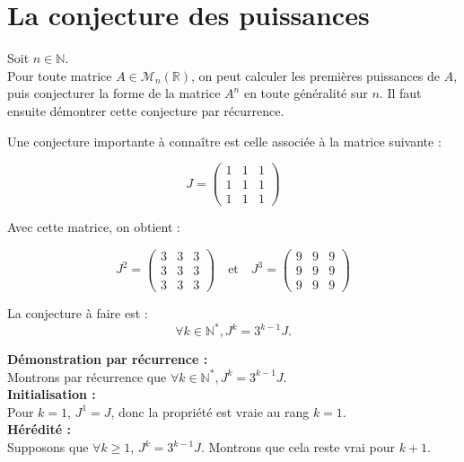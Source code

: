 








\section{La conjecture des puissances}

Soit $n \in \mathbb{N}$.\\
Pour toute matrice $A \in \mathcal{M}_n(\mathbb{R})$, on peut calculer les premières puissances de $A$, puis conjecturer la \og  forme \fg{}  de la matrice $A^n$ en toute généralité sur $n$. Il faut ensuite démontrer cette conjecture par récurrence.

Une conjecture importante à connaître est celle associée à la matrice suivante :

\[
J = 
\begin{pmatrix}
1 & 1 & 1\\
1 & 1 & 1\\
1 & 1 & 1
\end{pmatrix}
\]

Avec cette matrice, on obtient :

\[
J^2 = 
\begin{pmatrix}
3 & 3 & 3\\
3 & 3 & 3\\
3 & 3 & 3
\end{pmatrix}
\quad \text{et} \quad
J^3 = 
\begin{pmatrix}
9 & 9 & 9\\
9 & 9 & 9\\
9 & 9 & 9
\end{pmatrix}
\]

La conjecture à faire est : 
\[
\forall k \in \mathbb{N}^*, J^k = 3^{k-1} J.
\]

\textbf{Démonstration par récurrence :}\\
Montrons par récurrence que $\forall k \in \mathbb{N}^*, J^k = 3^{k-1} J$.\\

\textbf{Initialisation :}\\
Pour $k = 1$, $J^1 = J$, donc la propriété est vraie au rang $k=1$.\\

\textbf{Hérédité :}\\
Supposons que $\forall k \geq 1$, $J^k = 3^{k-1} J$. Montrons que cela reste vrai pour $k+1$.\\

